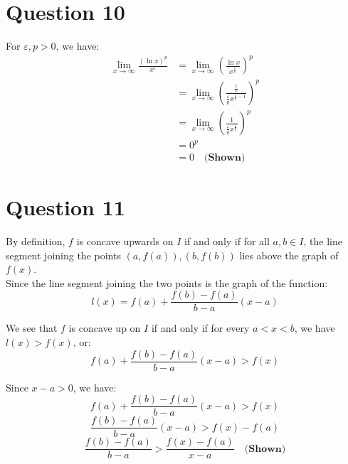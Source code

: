 \documentclass[11pt]{article}
\begin{document}
\newpage

\section{Question 10}
\label{sec:org2fed95e}

For \(\varepsilon, p > 0\), we have:
\begin{align*}
\lim_{x \rightarrow \infty} \frac{(\ln x)^p}{x^{\varepsilon}} &= \lim_{x \rightarrow \infty} \left( \frac{\ln x}{x^{\frac{\varepsilon}{p}}} \right)^p \\
&= \lim_{x \rightarrow \infty} \left( \frac{\frac{1}{x}}{\frac{\varepsilon}{p}x^{\frac{\varepsilon}{p} - 1}} \right)^p \\
&= \lim_{x \rightarrow \infty} \left( \frac{1}{\frac{\varepsilon}{p}x^{\frac{\varepsilon}{p}}} \right)^p \\
&= 0^p \\
&= 0 \quad \textbf{(Shown)}
\end{align*}


\section{Question 11}
\label{sec:org5cabd13}
By definition, \(f\) is concave upwards on \(I\) if and only if for all \(a, b \in I\), the line segment joining the points \((a, f(a)), (b, f(b))\) lies above the graph of \(f(x)\).
\\[0pt]

Since the line segment joining the two points is the graph of the function:
\[l(x) = f(a) + \frac{f(b) - f(a)}{b - a}(x - a)\]

We see that \(f\) is concave up on \(I\) if and only if for every \(a < x < b\), we have \(l(x) > f(x)\), or:
\[f(a) + \frac{f(b) - f(a)}{b - a}(x - a) > f(x)\]

Since \(x - a > 0\), we have:
\[f(a) + \frac{f(b) - f(a)}{b - a}(x - a) > f(x)\]
\[\frac{f(b) - f(a)}{b - a}(x - a) > f(x) - f(a)\]
\[\frac{f(b) - f(a)}{b - a} > \frac{f(x) - f(a)}{x - a} \quad \textbf{(Shown)}\]
\end{document}
